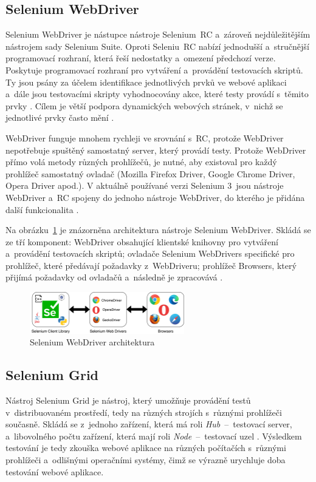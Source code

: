 \subsection*{Selenium WebDriver}
\label{sec:selenium_webdriver}
Selenium WebDriver je nástupce nástroje Selenium~RC a~zároveň nejdůležitějším nástrojem sady Selenium Suite. Oproti Seleniu~RC nabízí jednodušší a~stručnější programovací rozhraní, která řeší nedostatky a~omezení předchozí verze. Poskytuje programovací rozhraní pro vytváření a~provádění testovacích skriptů. Ty jsou psány za účelem identifikace jednotlivých prvků ve webové aplikaci a~dále jsou testovacími skripty vyhodnocovány akce, které testy provádí s~těmito prvky \cite{bib:selenium_grid}. Cílem je větší podpora dynamických webových stránek, v~nichž se jednotlivé prvky často mění \cite{bib:selenium_tool_suite}.

WebDriver funguje mnohem rychleji ve srovnání s~RC, protože WebDriver nepotřebuje spuštěný samostatný server, který provádí testy. Protože WebDriver přímo volá metody různých prohlížečů, je nutné, aby existoval pro každý prohlížeč samostatný ovladač (Mozilla Firefox Driver, Google Chrome Driver, Opera Driver apod.). V aktuálně používané verzi Selenium 3~jsou nástroje WebDriver a~RC spojeny do jednoho nástroje WebDriver, do kterého je přidána další funkcionalita \cite{bib:selenium_tool_suite}.

Na obrázku~\ref{img:selenium_webdriver} je znázorněna architektura nástroje Selenium WebDriver. Skládá se ze tří komponent: WebDriver obsahující klientské knihovny pro vytváření a~provádění testovacích skriptů; ovladače Selenium WebDrivers specifické pro prohlížeč, které předávají požadavky z~WebDriveru; prohlížeč Browsers, který přijímá požadavky od ovladačů a~následně je zpracovává \cite{bib:selenium_webdrivers}.

\begin{figure}[hbt]
	\centering
	\includegraphics[width=0.6\textwidth]{images/selenium_webdriver.jpg}
	\caption{Selenium WebDriver architektura}
	\label{img:selenium_webdriver}
\end{figure}

\subsection*{Selenium Grid}
Nástroj Selenium Grid je nástroj, který umožňuje provádění testů v~distribuovaném prostředí, tedy na různých strojích s~různými prohlížeči současně. Skládá se z~jednoho zařízení, která má roli \textit{Hub}~--~testovací server, a~libovolného počtu zařízení, která mají roli \textit{Node}~--~testovací uzel \cite{bib:selenium_grid}. Výsledkem testování je tedy zkouška webové aplikace na různých počítačích s~různými prohlížeči a~odlišnými operačními systémy, čimž se výrazně urychluje doba testování webové aplikace.

